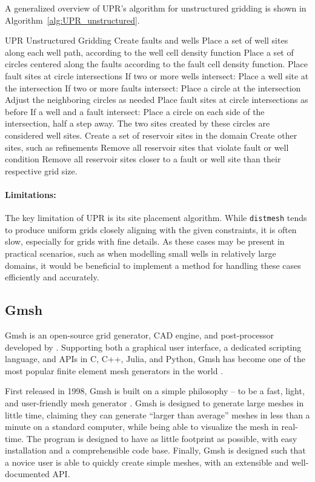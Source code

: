 A generalized overview of UPR's algorithm for unstructured gridding \cite[pp.51]{UPR_thesis} is shown in Algorithm~\ref{alg:UPR_unstructured}.
\begin{pseudocode}[float=ht,label=alg:UPR_unstructured]{UPR Unstructured Gridding}
Create faults and wells
    Place a set of well sites along each well path, according to the well cell density function
    Place a set of circles centered along the faults according to the fault cell density function. Place fault sites at circle intersections
    If two or more wells intersect:
        Place a well site at the intersection
    If two or more faults intersect:
        Place a circle at the intersection
        Adjust the neighboring circles as needed
        Place fault sites at circle intersections as before
    If a well and a fault intersect:
        Place a circle on each side of the intersection, half a step away. The two sites created by these circles are considered well sites.
Create a set of reservoir sites in the domain
Create other sites, such as refinements
Remove all reservoir sites that violate fault or well condition
Remove all reservoir sites closer to a fault or well site than their respective grid size.
\end{pseudocode}

\paragraph{Limitations:}
The key limitation of UPR is its site placement algorithm. While \verb|distmesh| tends to produce uniform grids closely aligning with the given constraints, it is often slow, especially for grids with fine details. As these cases may be present in practical scenarios, such as when modelling small wells in relatively large domains, it would be beneficial to implement a method for handling these cases efficiently and accurately.


\subsection{Gmsh}
\label{sec:Gmsh}
Gmsh is an open-source grid generator, CAD engine, and post-processor developed by \textcite{Gmsh_article}. Supporting both a graphical user interface, a dedicated scripting language, and APIs in C, C++, Julia, and Python, Gmsh has become one of the most popular finite element mesh generators in the world \cite{Gmsh_presentation}.

First released in 1998, Gmsh is built on a simple philosophy -- to be a fast, light, and user-friendly mesh generator \cite{Gmsh_article}. Gmsh is designed to generate large meshes in little time, claiming they can generate ``larger than average'' meshes in less than a minute on a standard computer, while being able to visualize the mesh in real-time. The program is designed to have as little footprint as possible, with easy installation and a comprehensible code base. Finally, Gmsh is designed such that a novice user is able to quickly create simple meshes, with an extensible and well-documented API.

